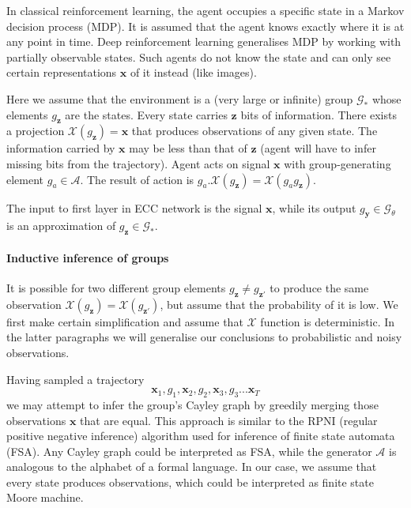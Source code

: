 \documentclass[12pt]{article}
\begin{document}
In classical reinforcement learning, the agent occupies a specific state in a Markov decision process (MDP). It is assumed that the agent knows exactly where it is at any point in time. Deep reinforcement learning generalises MDP by working with partially observable states. Such agents do not know the state and can only see certain representations $\boldsymbol{x}$ of it instead (like images).

Here we assume that the environment is a (very large or infinite) group $\mathcal{G}_*$ whose elements $g_{\boldsymbol{z}}$ are the states. Every state carries $\boldsymbol{z}$ bits of information. There exists a projection  $\mathcal{X}(g_{\boldsymbol{z}})=\boldsymbol{x}$ that produces observations of any given state. The information carried by $\boldsymbol{x}$ may be less than that of $\boldsymbol{z}$ (agent will have to infer missing bits from the trajectory). Agent acts on signal $\boldsymbol{x}$ with group-generating element $g_a\in \mathcal{A}$. The result of action is $g_a.\mathcal{X}(g_{\boldsymbol{z}})=\mathcal{X}(g_ag_{\boldsymbol{z}})$. 

The input to first layer in ECC network is the signal $\boldsymbol{x}$, while its output $g_{\boldsymbol{y}}\in\mathcal{G}_{\theta}$ is an approximation of $g_{\boldsymbol{z}}\in\mathcal{G}_{*}$. 

\paragraph{Inductive inference of groups}

It is possible for two different group elements $g_{\boldsymbol{z}}\ne g_{\boldsymbol{z}'}$ to produce the same observation $\mathcal{X}(g_{\boldsymbol{z}})=\mathcal{X}(g_{\boldsymbol{z}'})$, but assume that the probability of it is low. We first make certain simplification and assume that $\mathcal{X}$ function is deterministic. In the latter paragraphs we will generalise our conclusions to probabilistic and noisy observations.

Having sampled a trajectory
\[\boldsymbol{x}_1,g_1,\boldsymbol{x}_2,g_2,\boldsymbol{x}_3,g_3...\boldsymbol{x}_T\] 
we may attempt to infer the group's Cayley graph by greedily merging those observations $\boldsymbol{x}$ that are equal. This approach is similar to the RPNI (regular positive negative inference) algorithm used for inference of finite state automata (FSA). Any Cayley graph could be interpreted as FSA, while the generator $\mathcal{A}$ is analogous to the alphabet of a formal language. In our case, we assume that every state produces observations, which could be interpreted as finite state Moore machine. 
\end{document}
